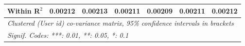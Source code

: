 \begin{table}[htbp]
\begin{threeparttable}[b]
\begin{tabular}{lcccccc}
         Within R$^2$                   & 0.00212         & 0.00213         & 0.00211         & 0.00209         & 0.00211          & 0.00212\\  
         \midrule \midrule
         \multicolumn{7}{l}{\emph{Clustered (User id) co-variance matrix, 95\% confidence intervals in brackets}}\\
         \multicolumn{7}{l}{\emph{Signif. Codes: ***: 0.01, **: 0.05, *: 0.1}}\\
      \end{tabular}
   \end{threeparttable}
\end{table}


